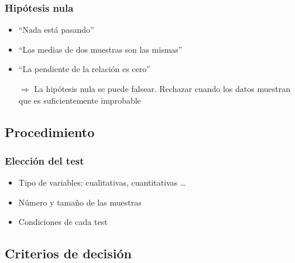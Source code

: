 \documentclass[mathserif]{beamer}
\begin{document}
\begin{frame}[label=null]
\frametitle{Hip\'otesis nula}
 \begin{itemize}[<+-| handout:1>]
   \item ``Nada est\'a pasando''
   \item ``Las medias de dos muestras son las mismas'' 
   \item ``La pendiente de la relaci\'on es cero''
\end{itemize}
\medskip
\begin{itemize}[<+-| handout:1>]
\item[$\Rightarrow$] La hip\'otesis nula \alert{se puede falsear}. Rechazar cuando los datos muestran que es suficientemente improbable
\end{itemize}
\end{frame}%


\subsection[Procedimiento]{Procedimiento}

\begin{frame}[label=testchoice]
   \frametitle{Elecci\'on del test}
   \begin{itemize}
      \item Tipo de variables: cualitativas, cuantitativas \ldots
      \item N\'umero y tama\~no de las muestras
      \item Condiciones de cada test
   \end{itemize}
\end{frame}%


\subsection[Decisi\'on]{Criterios de decisi\'on}
\end{document}
